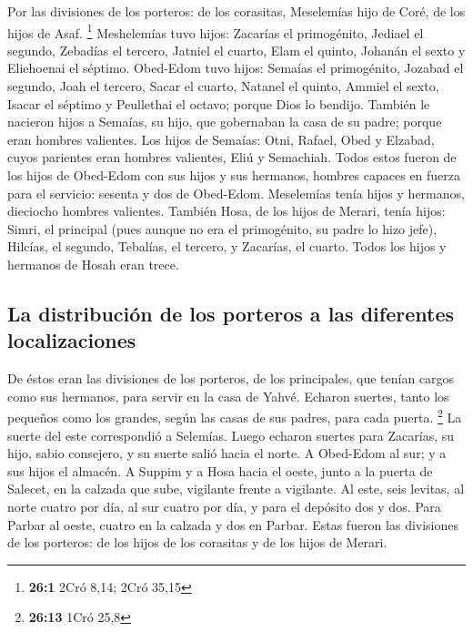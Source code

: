  Por las divisiones de los porteros: de los corasitas,
Meselemías hijo de Coré, de los hijos de Asaf. \footnote{\textbf{26:1}
  2Cró 8,14; 2Cró 35,15}  Meshelemías tuvo hijos: Zacarías
el primogénito, Jediael el segundo, Zebadías el tercero, Jatniel el
cuarto,  Elam el quinto, Johanán el sexto y Eliehoenai el
séptimo.  Obed-Edom tuvo hijos: Semaías el primogénito,
Jozabad el segundo, Joah el tercero, Sacar el cuarto, Natanel el quinto,
 Ammiel el sexto, Isacar el séptimo y Peullethai el
octavo; porque Dios lo bendijo.  También le nacieron hijos
a Semaías, su hijo, que gobernaban la casa de su padre; porque eran
hombres valientes.  Los hijos de Semaías: Otni, Rafael,
Obed y Elzabad, cuyos parientes eran hombres valientes, Eliú y
Semachiah.  Todos estos fueron de los hijos de Obed-Edom
con sus hijos y sus hermanos, hombres capaces en fuerza para el
servicio: sesenta y dos de Obed-Edom.  Meselemías tenía
hijos y hermanos, dieciocho hombres valientes.  También
Hosa, de los hijos de Merari, tenía hijos: Simri, el principal (pues
aunque no era el primogénito, su padre lo hizo jefe), 
Hilcías, el segundo, Tebalías, el tercero, y Zacarías, el cuarto. Todos
los hijos y hermanos de Hosah eran trece.

\hypertarget{la-distribuciuxf3n-de-los-porteros-a-las-diferentes-localizaciones}{%
\subsection{La distribución de los porteros a las diferentes
localizaciones}\label{la-distribuciuxf3n-de-los-porteros-a-las-diferentes-localizaciones}}

 De éstos eran las divisiones de los porteros, de los
principales, que tenían cargos como sus hermanos, para servir en la casa
de Yahvé.  Echaron suertes, tanto los pequeños como los
grandes, según las casas de sus padres, para cada puerta. \footnote{\textbf{26:13}
  1Cró 25,8}  La suerte del este correspondió a Selemías.
Luego echaron suertes para Zacarías, su hijo, sabio consejero, y su
suerte salió hacia el norte.  A Obed-Edom al sur; y a sus
hijos el almacén.  A Suppim y a Hosa hacia el oeste,
junto a la puerta de Salecet, en la calzada que sube, vigilante frente a
vigilante.  Al este, seis levitas, al norte cuatro por
día, al sur cuatro por día, y para el depósito dos y dos.
 Para Parbar al oeste, cuatro en la calzada y dos en
Parbar.  Estas fueron las divisiones de los porteros: de
los hijos de los corasitas y de los hijos de Merari.

